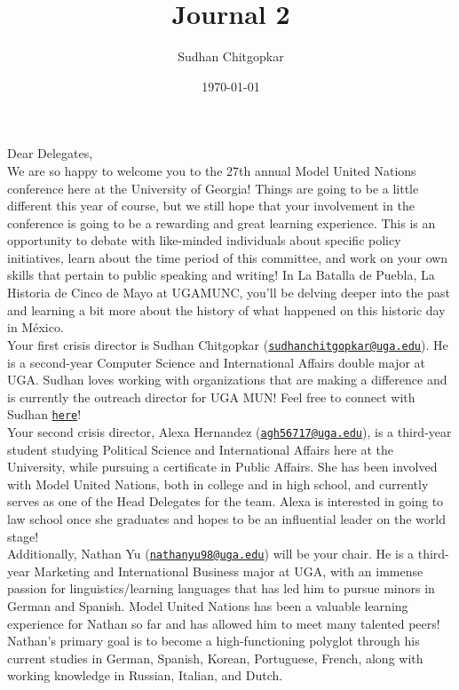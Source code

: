 \documentclass[10pt, letterpaper]{article}
\title{Journal 2}
\author{Sudhan Chitgopkar}
\date{\today}
\begin{document}
Dear Delegates, \\

We are so happy to welcome you to the 27th annual Model United Nations
conference here at the University of Georgia! Things are going to be a
little different this year of course, but we still hope that your
involvement in the conference is going to be a rewarding and great
learning experience. This is an opportunity to debate with like-minded
individuals about specific policy initiatives, learn about the time
period of this committee, and work on your own skills that pertain to
public speaking and writing! In La Batalla de Puebla, La Historia de
Cinco de Mayo at UGAMUNC, you'll be delving deeper into the past and
learning a bit more about the history of what happened on this historic
day in México. \\

Your first crisis director is Sudhan Chitgopkar
(\texttt{\href{mailto:sudhanchitgopkar@uga.edu}{{sudhanchitgopkar@uga.edu}}}). He is a second-year Computer Science and International Affairs double major at UGA. Sudhan loves working with organizations that are making a difference and is currently the outreach director for UGA MUN! Feel free to connect with Sudhan \href{http://follow.sudhanchitgopkar.com}{\nolinkurl{here}}! \\

Your second crisis director, Alexa Hernandez
(\texttt{\href{mailto:agh56717@uga.edu}{{agh56717@uga.edu}}}), is a
third-year student studying Political Science and International Affairs
here at the University, while pursuing a certificate in Public Affairs.
She has been involved with Model United Nations, both in college and in
high school, and currently serves as one of the Head Delegates for the
team. Alexa is interested in going to law school once she graduates and
hopes to be an influential leader on the world stage! \\

Additionally, Nathan Yu
(\texttt{\href{mailto:nathanyu98@uga.edu}{{nathanyu98@uga.edu}}}) will
be your chair. He is a third-year Marketing and International Business
major at UGA, with an immense passion for linguistics/learning languages
that has led him to pursue minors in German and Spanish. Model United
Nations has been a valuable learning experience for Nathan so far and
has allowed him to meet many talented peers! Nathan's primary goal is to
become a high-functioning polyglot through his current studies in
German, Spanish, Korean, Portuguese, French, along with working
knowledge in Russian, Italian, and Dutch. \\
\end{document}
